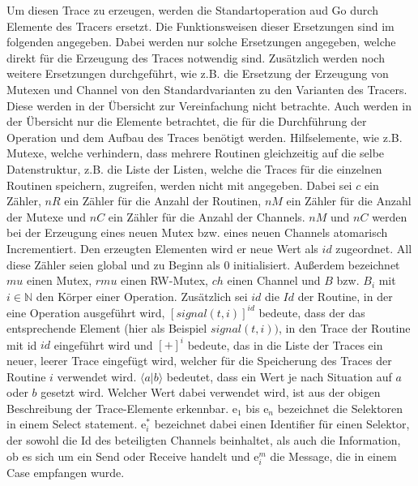 Um diesen Trace zu erzeugen, werden die Standartoperation aud Go durch Elemente
des Tracers ersetzt. Die Funktionsweisen dieser Ersetzungen sind im folgenden 
angegeben. Dabei werden nur solche Ersetzungen angegeben, welche direkt 
für die Erzeugung
des Traces notwendig sind. Zusätzlich werden noch 
weitere Ersetzungen durchgeführt, wie z.B. die Ersetzung der Erzeugung von 
Mutexen und Channel von den Standardvarianten zu den Varianten des Tracers. 
Diese werden in der Übersicht zur Vereinfachung nicht betrachte. Auch werden 
in der Übersicht nur die Elemente betrachtet, die für die Durchführung der 
Operation und dem Aufbau des Traces benötigt werden. Hilfselemente, wie z.B. 
Mutexe, welche verhindern, dass mehrere Routinen gleichzeitig auf die selbe 
Datenstruktur, 
z.B. die Liste der Listen, welche die Traces für die einzelnen Routinen 
speichern, zugreifen, werden nicht mit angegeben. Dabei sei $c$ ein 
Zähler, $nR$ ein Zähler für die Anzahl der Routinen, $nM$ ein Zähler für die 
Anzahl der Mutexe und $nC$ ein Zähler für die Anzahl der Channels. $nM$ und $nC$
werden bei der Erzeugung eines neuen Mutex bzw. eines neuen Channels atomarisch 
Incrementiert. Den erzeugten Elementen wird er neue Wert als $id$ zugeordnet. All diese 
Zähler seien global und zu Beginn als $0$ initialisiert. Außerdem bezeichnet 
$mu$ einen Mutex, $rmu$ einen RW-Mutex, $ch$ einen Channel und $B$ bzw. $B_i$
mit $i\in\mathbb{N}$ den 
Körper einer Operation. Zusätzlich
sei $id$ die $Id$ der Routine, in der eine Operation ausgeführt wird,
$[signal(t, i)]^{id}$ bedeute, dass der das entsprechende Element (hier als 
Beispiel $signal(t, i))$, in den Trace der Routine mit id $id$ eingeführt wird
und $[+]^i$ bedeute, das in die Liste der Traces ein neuer, leerer Trace 
eingefügt wird, welcher für die Speicherung des Traces der Routine $i$ 
verwendet wird. 
$\langle a|b\rangle$ bedeutet, dass ein Wert je nach Situation auf $a$ oder $b$ gesetzt 
wird. Welcher Wert dabei verwendet wird, ist aus der obigen Beschreibung der 
Trace-Elemente erkennbar. $\text{e}_1$ bis $\text{e}_n$ bezeichnet die Selektoren in einem Select statement.
$\text{e}_i^*$ bezeichnet dabei einen Identifier für einen Selektor, der sowohl die 
Id des beteiligten Channels beinhaltet, als auch die Information, ob es sich um ein 
Send oder Receive handelt und $\text{e}_i^m$ die Message, die in einem Case 
empfangen wurde. 
